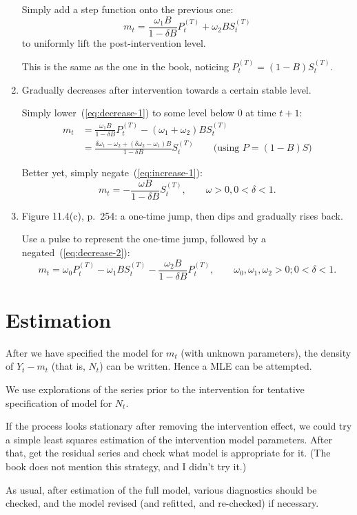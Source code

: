 \documentclass[12pt]{article}
\begin{document}
\begin{enumerate}
    Simply add a step function onto the previous one:
    \begin{equation}\label{eq:decrease-2}
        m_t = \frac{\omega_1 B}{1 - \delta B} P_t^{(T)}
                + \omega_2 B S_t^{(T)}
    \end{equation}
    to uniformly lift the post-intervention level.

    This is the same as the one in the book,
    noticing $P_t^{(T)} = (1-B)S_{t}^{(T)}$.

\item Gradually decreases after intervention towards a certain stable level.

    Simply lower~(\ref{eq:decrease-1}) to some level below 0 at time $t+1$:
    \[\begin{split}
        m_t &= \frac{\omega_1 B}{1 - \delta B} P_t^{(T)}
                - (\omega_1 + \omega_2) B S_t^{(T)}
                \\
            &= \frac{\delta \omega_1 - \omega_2
                + (\delta \omega_2 - \omega_1)B}
                {1-\delta B} S_t^{(T)}
                \qquad \text{(using $P = (1-B)S$)}
    \end{split}
    \]

    Better yet, simply negate~(\ref{eq:increase-1}):
    \[
        m_t = -\frac{\omega B}{1 - \delta B} S_t^{(T)}
        ,\qquad \omega > 0, 0<\delta<1.
    \]

\item Figure 11.4(c), p.~254: a one-time jump,
    then dips and gradually rises back.

    Use a pulse to represent the one-time jump,
    followed by a negated~(\ref{eq:decrease-2}):
    \[
        m_t = \omega_0 P_t^{(T)} - \omega_1 B S_t^{(T)}
            - \frac{\omega_2 B}{1 - \delta B} P_t^{(T)}
        ,\qquad \omega_0,\omega_1,\omega_2 > 0; 0<\delta<1.
    \]

\end{enumerate}

\section{Estimation}

After we have specified the model for $m_t$ (with unknown parameters),
the density of $Y_t - m_t$ (that is, $N_t$) can be written.
Hence a MLE can be attempted.

We use explorations of the series prior to the intervention
for tentative specification of model for $N_t$.

If the process looks stationary after removing the intervention effect,
we could try a simple least squares estimation of the intervention model
parameters.
After that, get the residual series and check what model is appropriate
for it.
(The book does not mention this strategy, and I didn't try it.)

As usual,
after estimation of the full model,
various diagnostics should be checked,
and the model revised (and refitted, and re-checked) if necessary.
\end{document}
